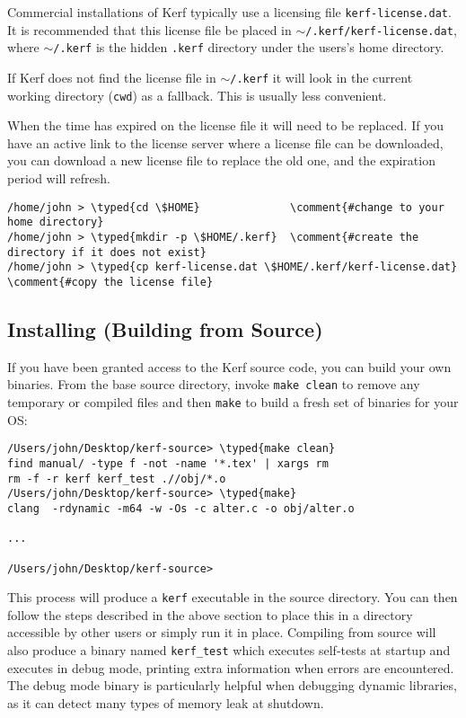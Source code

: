 \documentclass{article}
\newcommand{\typed}[1]{\textcolor{TealBlue}{#1}}
\newcommand{\comment}[1]{\textcolor{Orange}{#1}}
\begin{document}
Commercial installations of Kerf typically use a licensing file \texttt{kerf-license.dat}. It is recommended that this license file be placed in \texttt{$\sim$/.kerf/kerf-license.dat}, where \texttt{$\sim$/.kerf} is the hidden \texttt{.kerf} directory under the users's home directory. 

\vspace{0.5cm}

If Kerf does not find the license file in \texttt{$\sim$/.kerf} it will look in the current working directory (\texttt{cwd}) as a fallback. This is usually less convenient.

\vspace{0.5cm}

When the time has expired on the license file it will need to be replaced. If you have an active link to the license server where a license file can be downloaded, you can download a new license file to replace the old one, and the expiration period will refresh.

\begin{Verbatim}
/home/john > \typed{cd \$HOME}              \comment{#change to your home directory}
/home/john > \typed{mkdir -p \$HOME/.kerf}  \comment{#create the directory if it does not exist}
/home/john > \typed{cp kerf-license.dat \$HOME/.kerf/kerf-license.dat}  \comment{#copy the license file}
\end{Verbatim}


\pagebreak
\subsection{Installing (Building from Source)}
If you have been granted access to the Kerf source code, you can build your own binaries. From the base source directory, invoke \texttt{make clean} to remove any temporary or compiled files and then \texttt{make} to build a fresh set of binaries for your OS:

\begin{Verbatim}
/Users/john/Desktop/kerf-source> \typed{make clean}
find manual/ -type f -not -name '*.tex' | xargs rm
rm -f -r kerf kerf_test .//obj/*.o 
/Users/john/Desktop/kerf-source> \typed{make}
clang  -rdynamic -m64 -w -Os -c alter.c -o obj/alter.o

...

/Users/john/Desktop/kerf-source>
\end{Verbatim}

This process will produce a \texttt{kerf} executable in the source directory. You can then follow the steps described in the above section to place this in a directory accessible by other users or simply run it in place. Compiling from source will also produce a binary named \texttt{kerf\_test} which executes self-tests at startup and executes in debug mode, printing extra information when errors are encountered. The debug mode binary is particularly helpful when debugging dynamic libraries, as it can detect many types of memory leak at shutdown.
\end{document}
